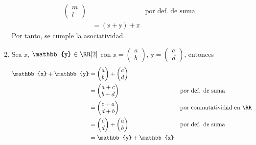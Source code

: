 \begin{examplebox}{}{}
\begin{enumerate}[label=\roman*), topsep=6pt, itemsep=0pt]
\begin{align*}
\begin{pmatrix}
                m \\
                l
            \end{pmatrix} && \text{por def. de suma} \\
            & = (\mathbb{x} + \mathbb{y}) + \mathbb{z}
        \end{align*}
        Por tanto, se cumple la asociatividad.
        \item Sea $\mathbb{x}$, $\mathbb{y} \in \RR[2]$ con $\mathbb{x} = \begin{pmatrix}
            a \\
            b
        \end{pmatrix}$, $\mathbb{y} = \begin{pmatrix}
            c \\
            d
        \end{pmatrix}$, entonces
        \begin{align*}
            \mathbb{x} + \mathbb{y} & = \begin{pmatrix}
                a \\
                b
            \end{pmatrix} + \begin{pmatrix}
                c \\
                d
            \end{pmatrix} \\
            & = \begin{pmatrix}
                a + c \\
                b + d
            \end{pmatrix} && \text{por def. de suma} \\
            & = \begin{pmatrix}
                c + a \\
                d + b
            \end{pmatrix} && \text{por conmutatividad en $\RR$} \\
            & = \begin{pmatrix}
                c \\
                d
            \end{pmatrix} + \begin{pmatrix}
                a \\
                b
            \end{pmatrix} && \text{por def. de suma} \\
            & = \mathbb{y} + \mathbb{x}
        \end{align*}

\end{enumerate}
\end{examplebox}
